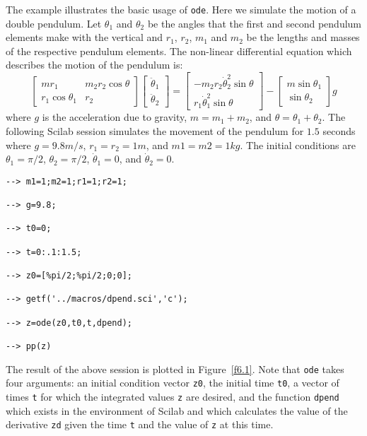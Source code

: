 	The example illustrates the basic usage of {\tt ode}.
Here we simulate the motion of a double pendulum.  
Let $\theta_1$ and $\theta_2$ be the angles that the first
and second pendulum elements make with the vertical and
$r_1$, $r_2$, $m_1$
and $m_2$ be the lengths and masses of 
the respective pendulum elements.  
The non-linear
differential equation which describes the motion of the pendulum
is:
\begin{equation}
\left[\begin{array}{cc}
mr_1&m_2r_2\cos\theta\\
r_1\cos\theta_1&r_2
\end{array}\right]
\left[\begin{array}{c}
\ddot{\theta}_1\\
\ddot{\theta}_2
\end{array}\right]
=
\left[\begin{array}{c}
-m_2r_2\dot{\theta}_2^2\sin\theta\\
r_1\dot{\theta}_1^2\sin\theta
\end{array}\right]
-
\left[\begin{array}{c}
m\sin\theta_1\\
\sin\theta_2
\end{array}\right]
g
\label{e6.1}
\end{equation}
where $g$ is the acceleration due to gravity, $m=m_1+m_2$, and 
$\theta=\theta_1+\theta_2$.
The following Scilab session simulates the movement
of the pendulum for $1.5$ seconds where $g=9.8m/s$,
$r_1=r_2=1m$, and $m1=m2=1kg$.  The initial conditions are
$\theta_1=\pi/2$, $\theta_2=\pi/2$, $\dot{\theta}_1=0$, and 
$\dot{\theta}_2=0$.
\begin{verbatim}
--> m1=1;m2=1;r1=1;r2=1;
 
--> g=9.8;
 
--> t0=0;
 
--> t=0:.1:1.5;
 
--> z0=[%pi/2;%pi/2;0;0];
 
--> getf('../macros/dpend.sci','c');
 
--> z=ode(z0,t0,t,dpend);
 
--> pp(z)
\end{verbatim}
The result of the above session is plotted in Figure~\ref{f6.1}.
Note that {\tt ode} takes four arguments: an initial condition vector
{\tt z0}, the initial time {\tt t0}, a vector of times {\tt t}
for which the integrated values {\tt z} are desired, and the function
 {\tt dpend} which exists in the environment of Scilab and which
calculates the value of the derivative {\tt zd} given the time {\tt t} 
and the value of {\tt z} at this time.

